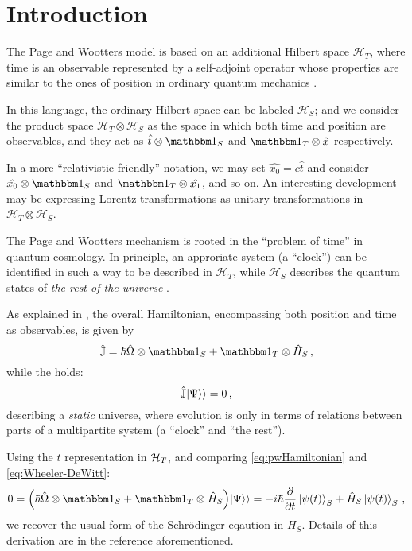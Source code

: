 \section{Introduction}

The Page and Wootters model is based on
an additional Hilbert space $\mathcal{H}_T$,
where time is an observable
represented by a self-adjoint operator
whose properties are similar to the ones of position
in ordinary quantum mechanics
\parencite{Lloyd:Time, Maccone:Pauli}.

In this language, the ordinary Hilbert space can be labeled $\mathcal{H}_S$;
and we consider the product space $\mathcal{H}_T \otimes \mathcal{H}_S$ as
the space in which both time and position are observables, and they act as
$\hat{t} \otimes \idop_S$ and $\idop_T \otimes \hat{x}$
respectively.

\begin{remark}
  In a more ``relativistic friendly'' notation, we may set
  $\hat{x_0} = c\hat{t}$ and consider
  $\hat{x_0} \otimes \idop_S$ and $\idop_T \otimes \hat{x_1}$,
  and so on. An interesting development may be expressing
  Lorentz transformations as unitary transformations in
  $\mathcal{H}_T \otimes \mathcal{H}_S$.
\end{remark}

The Page and Wootters mechanism is rooted in the ``problem of time''
in quantum cosmology.
In principle, an approriate system (a ``clock'') can be identified in such a way
to be described in $\mathcal{H}_T$, while $\mathcal{H}_S$ describes
the quantum states of \emph{the rest of the universe} \parencite{Marletto:Evolution}.

As explained in \cite{Lloyd:Time, Maccone:Pauli}, the overall Hamiltonian,
encompassing both position and time as observables, is given by
\begin{equation}\label{eq:pwHamiltonian}
  \hat{\mathbb{J}} = \hbar\hat{\Omega}\ox\idop_S + \idop_T\ox\hat{H}_S \,\text{,}
\end{equation}
while the  holds:
\begin{equation}\label{eq:Wheeler-DeWitt}
  \hat{\mathbb{J}}|\Psi\rangle\rangle = 0 \,\text{,}
\end{equation}
describing a \emph{static} universe, where evolution is only
in terms of relations between parts of a multipartite system
(a ``clock'' and ``the rest'').

Using the $t$ representation in $\mathcal{H}_T$,
and comparing \eqref{eq:pwHamiltonian} and \eqref{eq:Wheeler-DeWitt}:
\begin{equation}
  0 = \qty(\hbar\hat{\Omega}\ox\idop_S + \idop_{T}\ox\hat{H}_S)\dket{\Psi}
    = -i\hbar\pdv{t}\ket{\psi(t)}_{S} + \hat{H}_S\ket{\psi(t)}_{S}
    \,\text{,}
\end{equation}
we recover the usual form of the Schr\"{o}dinger eqaution in $H_S$.
Details of this derivation are in the reference aforementioned.

